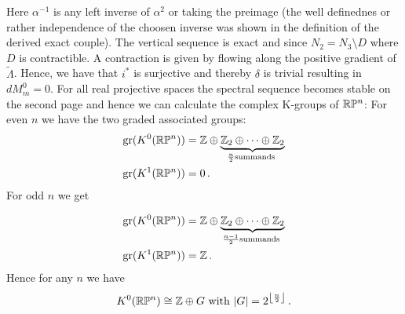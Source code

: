 \begin{example}
			Here $\alpha^{-1}$ is any left inverse of $\alpha^2$ or taking the preimage (the well definednes or rather independence of the choosen inverse was shown in the definition of the derived exact couple). The vertical sequence is exact and since $N_2=N_3\setminus D$ where $D$ is contractible. A contraction is given by flowing along the positive gradient of $\tilde{\Lambda}$. Hence, we have that $i^*$ is surjective and thereby $\delta$ is trivial resulting in $dM_m^0=0$. For all real projective spaces the spectral sequence becomes stable on the second page and hence we can calculate the complex K-groups of $\mathbb{R}\mathbb{P}^n$: 
			For even $n$ we have the two graded associated groups:
			\begin{align*}
				\mathrm{gr}(K^0(\mathbb{R}\mathbb{P}^n))&=\mathbb{Z}\oplus \underbrace{\mathbb{Z}_2 \oplus \cdots \oplus \mathbb{Z}_2}_{\frac{n}{2} \text{summands }} \\
				\mathrm{gr}(K^1(\mathbb{R}\mathbb{P}^n))&=0\,.
			\end{align*}
			For odd $n$ we get
			
						\begin{align*}
				\mathrm{gr}(K^0(\mathbb{R}\mathbb{P}^n))&=\mathbb{Z}\oplus \underbrace{\mathbb{Z}_2 \oplus \cdots \oplus \mathbb{Z}_2}_{\frac{n-1}{2} \text{summands }} \\
				\mathrm{gr}(K^1(\mathbb{R}\mathbb{P}^n))&=\mathbb{Z}\,.
			\end{align*}
			Hence for any $n$ we have \begin{equation*}
				K^0(\mathbb{R}\mathbb{P}^n)\cong \mathbb{Z}\oplus G \text{ with } |G|=2^{\left\lfloor \frac{n}{2}\right\rfloor}\,.
			\end{equation*}
			
			
			
			
			
			

\end{example}
